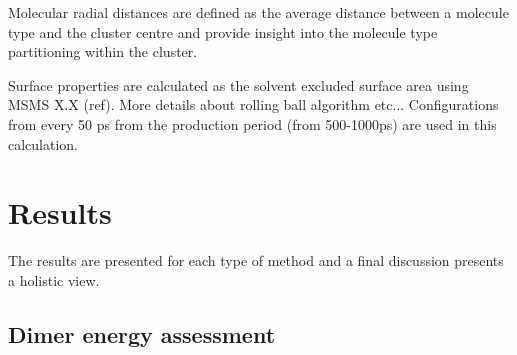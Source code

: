 Molecular radial distances are defined as the average distance between a molecule type and the cluster centre and provide insight into the molecule type partitioning within the cluster.

Surface properties are calculated as the solvent excluded surface area using MSMS X.X (ref). More details about rolling ball algorithm etc...
Configurations from every 50 ps from the production period (from 500-1000ps) are used in this calculation.


\section{Results}

The results are presented for each type of method and a final discussion presents a holistic view.

\subsection{Dimer energy assessment} 

